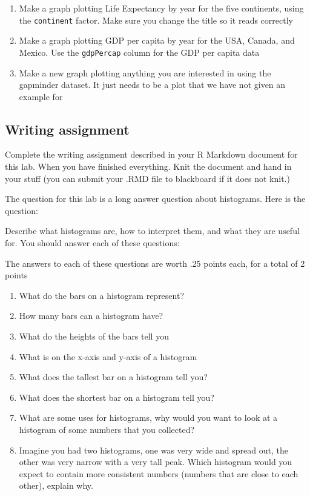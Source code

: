 \documentclass[
]{book}
\providecommand{\tightlist}{%
  \setlength{\itemsep}{0pt}\setlength{\parskip}{0pt}}
\begin{document}
\begin{enumerate}
\def\labelenumi{\arabic{enumi}.}
\item
  Make a graph plotting Life Expectancy by year for the five continents, using the \texttt{continent} factor. Make sure you change the title so it reads correctly
\item
  Make a graph plotting GDP per capita by year for the USA, Canada, and Mexico. Use the \texttt{gdpPercap} column for the GDP per capita data
\item
  Make a new graph plotting anything you are interested in using the gapminder dataset. It just needs to be a plot that we have not given an example for
\end{enumerate}

\hypertarget{writing-assignment}{%
\subsection{Writing assignment}\label{writing-assignment}}

Complete the writing assignment described in your R Markdown document for this lab. When you have finished everything. Knit the document and hand in your stuff (you can submit your .RMD file to blackboard if it does not knit.)

The question for this lab is a long answer question about histograms. Here is the question:

Describe what histograms are, how to interpret them, and what they are useful for. You should answer each of these questions:

The answers to each of these questions are worth .25 points each, for a total of 2 points

\begin{enumerate}
\def\labelenumi{\alph{enumi}.}
\tightlist
\item
  What do the bars on a histogram represent?
\item
  How many bars can a histogram have?
\item
  What do the heights of the bars tell you
\item
  What is on the x-axis and y-axis of a histogram
\item
  What does the tallest bar on a histogram tell you?
\item
  What does the shortest bar on a histogram tell you?
\item
  What are some uses for histograms, why would you want to look at a histogram of some numbers that you collected?
\item
  Imagine you had two histograms, one was very wide and spread out, the other was very narrow with a very tall peak. Which histogram would you expect to contain more consistent numbers (numbers that are close to each other), explain why.
\end{enumerate}
\end{document}
